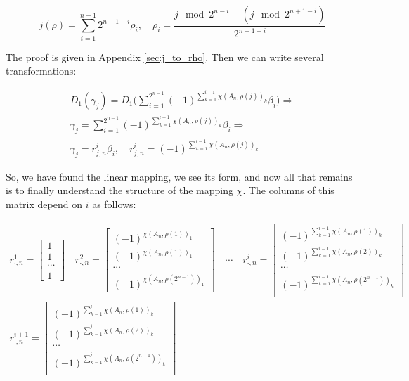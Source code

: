 \documentclass[a4paper, openany, 12pt]{article}
\theoremstyle{remark}
\theoremstyle{definition}
\begin{document}
\begin{equation}
    j(\rho) = \sum_{i=1}^{{n-1}}2^{n-1-i}\rho_{i}, \quad \rho_i = \frac{j\mod 2^{n-i} - (j\mod2^{n+1-i}) }{2^{n-1-i}}
\end{equation}

The proof is given in Appendix \ref{sec:j_to_rho}.
Then we can write several transformations:


\begin{align}
    D_1(\gamma_j) = D_1\bigg(\sum_{i=1}^{2^{n-1}}(-1)^{\sum_{k = 1}^{i-1}\chi(A_n,\rho(j))_k}\beta_i \bigg) \Rightarrow \\
    \gamma_j = \sum_{i=1}^{2^{n-1}}(-1)^{\sum_{k = 1}^{i-1}\chi(A_n,\rho(j))_k}\beta_i \Rightarrow\\
    \gamma_j = r_{j,n}^i\beta_i, \quad r_{j,n}^i = (-1)^{\sum_{k = 1}^{i-1}\chi(A_n,\rho(j))_k}
\end{align}


So, we have found the linear mapping, we see its form, and now all that remains is to finally understand the structure of the mapping \(\chi\).
The columns of this matrix depend on \(i\) as follows:

\begin{align}
    r^1_{\cdot,n} = \begin{bmatrix}
        1\\1\\\cdots\\1
    \end{bmatrix} \quad r^2_{\cdot,n} = \begin{bmatrix}
        (-1)^{\chi(A_n,\rho(1))_1}\\
        (-1)^{\chi(A_n,\rho(1))_1}\\
        \cdots \\
        (-1)^{\chi(A_n,\rho(2^{n-1}))_1}
\end{bmatrix} \quad \cdots\quad r^i_{\cdot,n} = \begin{bmatrix}
        (-1)^{\sum_{k = 1}^{i-1}\chi(A_n,\rho(1))_k}\\
        (-1)^{\sum_{k = 1}^{i-1}\chi(A_n,\rho(2))_k}\\
        \cdots \\
        (-1)^{\sum_{k = 1}^{i-1}\chi(A_n,\rho(2^{n-1}))_k}\\
\end{bmatrix} \\ r^{i+1}_{\cdot,n} = \begin{bmatrix}
        (-1)^{\sum_{k = 1}^{i}\chi(A_n,\rho(1))_k}\\
        (-1)^{\sum_{k = 1}^{i}\chi(A_n,\rho(2))_k}\\
        \cdots \\
        (-1)^{\sum_{k = 1}^{i}\chi(A_n,\rho(2^{n-1}))_k}\\
\end{bmatrix}
\end{align}
\end{document}
